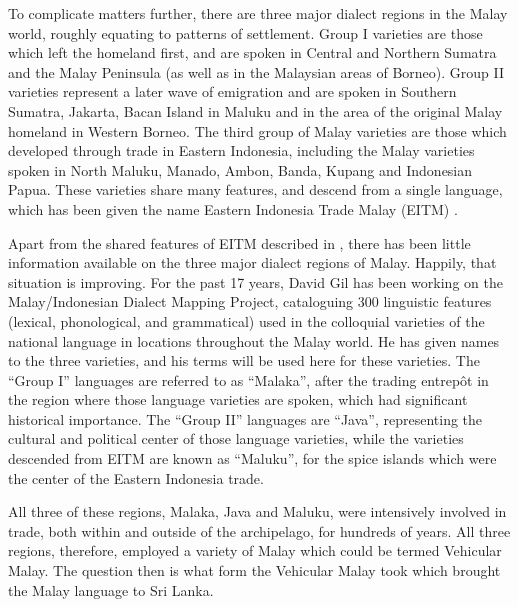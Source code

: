 To complicate matters further, there are three major dialect regions in the Malay world, roughly equating to patterns of settlement. Group I varieties are those which left the homeland first, and are spoken in Central and Northern Sumatra and the Malay Peninsula (as well as in the Malaysian areas of Borneo). Group II varieties represent a later wave of emigration and are spoken in Southern Sumatra, Jakarta, Bacan Island in Maluku and in the area of the original Malay homeland in Western Borneo. The third group of Malay varieties are those which developed through trade in Eastern Indonesia, including the Malay varieties spoken in North Maluku, Manado, Ambon, Banda, Kupang and Indonesian Papua. These varieties share many features, and descend from a single language, which has been given the name Eastern Indonesia Trade Malay (EITM) \citep[298]{Paauw2008}.

Apart from the shared features of EITM described in \citet{Paauw2008}, there has been little information available on the three major dialect regions of Malay. Happily, that situation is improving. For the past 17 years, David Gil has been working on the Malay/Indonesian Dialect Mapping Project, cataloguing 300 linguistic features (lexical, phonological, and grammatical) used in the colloquial varieties of the national language  in locations throughout the Malay world. He has given names to the three varieties, and his terms will be used here for these varieties. The ``Group I'' languages are referred to as ``Malaka'', after the trading entrep\^ot in the region where those language varieties are spoken, which had significant historical importance. The ``Group II'' languages are ``Java'', representing the cultural and political center of those language varieties, while the varieties descended from EITM are known as ``Maluku'', for the spice islands which were the center of the Eastern Indonesia trade.

All three of these regions, Malaka, Java and Maluku, were intensively involved in trade, both within and outside of the archipelago, for hundreds of years. All three regions, therefore, employed a variety of Malay which could be termed Vehicular Malay. The question then is what form the Vehicular Malay took which brought the Malay language to Sri Lanka.

